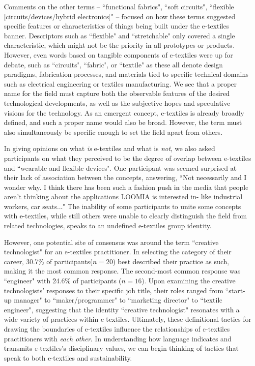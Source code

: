 Comments on the other terms -- ``functional fabrics", ``soft circuits", ``flexible [circuits/devices/hybrid electronics]" -- focused on how these terms suggested specific features or characteristics of things being built under the e-textiles banner. Descriptors such as ``flexible" and ``stretchable" only covered a single characteristic, which might not be the priority in all prototypes or products. However, even words based on tangible components of e-textiles were up for debate, such as ``circuits", ``fabric", or ``textile" as these all denote design paradigms, fabrication processes, and materials tied to specific technical domains such as electrical engineering or textiles manufacturing. We see that a proper name for the field must capture both the observable features of the desired technological developments, as well as the subjective hopes and speculative visions for the technology. As an emergent concept, e-textiles is already broadly defined, and such a proper name would also be broad. However, the term must also simultaneously be specific enough to set the field apart from others.

In giving opinions on what \textit{is} e-textiles and what is \textit{not}, we also asked participants on what they perceived to be the degree of overlap between e-textiles and ``wearable and flexible devices". One participant was seemed surprised at their lack of association between the concepts, answering, ``Not necessarily and I wonder why. I think there has been such a fashion push in the media that people aren’t thinking about the applications LOOMIA is interested in- like industrial workers, car seats..." The inability of some participants to unite some concepts with e-textiles, while still others were unable to clearly distinguish the field from related technologies, speaks to an undefined e-textiles group identity. 

However, one potential site of consensus was around the term ``creative technologist" for an e-textiles practitioner. In selecting the category of their career, 30.7\% of participants($n=20$) best described their practice as such, making it the most common response. The second-most common response was ``engineer" with 24.6\% of participants ($n=16$). Upon examining the creative technologists' responses to their specific job title, their roles ranged from ``start-up manager" to ``maker/programmer" to ``marketing director" to ``textile engineer", suggesting that the identity ``creative technologist" resonates with a wide variety of practices within e-textiles. Ultimately, these definitional tactics for drawing the boundaries of e-textiles influence the relationships of e-textiles practitioners with \textit{each other}. In understanding how language indicates and transmits e-textiles's disciplinary values, we can begin thinking of tactics that speak to both e-textiles and sustainability.

